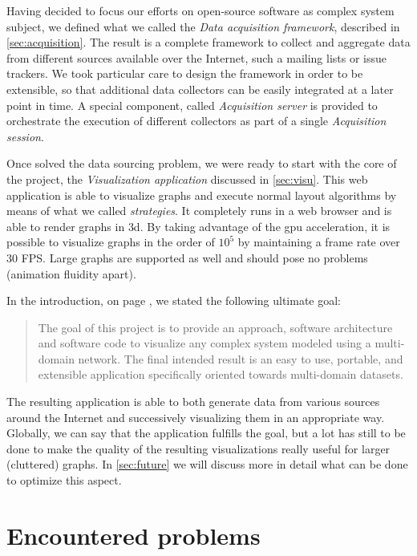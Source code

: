 Having decided to focus our efforts on open-source software as complex system subject, we defined what we called the \emph{Data acquisition framework}, described in \vref{sec:acquisition}. The result is a complete framework to collect and aggregate data from different sources available over the Internet, such a mailing lists or issue trackers. We took particular care to design the framework in order to be extensible, so that additional data collectors can be easily integrated at a later point in time. A special component, called \emph{Acquisition server} is provided to orchestrate the execution of different collectors as part of a single \emph{Acquisition session}.

Once solved the data sourcing problem, we were ready to start with the core of the project, the \emph{Visualization application} discussed in \vref{sec:visu}. This web application is able to visualize graphs and execute normal layout algorithms by means of what we called \emph{strategies}. It completely runs in a web browser and is able to render graphs in \gls{3d}. By taking advantage of the \gls{gpu} acceleration, it is possible to visualize graphs in the order of $10^5$ by maintaining a frame rate over 30 FPS. Large graphs are supported as well and should pose no problems (animation fluidity apart).

In the introduction, on page \pageref{sec:intro/goals}, we stated the following ultimate goal:

\begin{quote}
The goal of this project is to provide an approach, software architecture and software code to visualize any complex system modeled using a multi-domain network. The final intended result is an easy to use, portable, and extensible application specifically oriented towards multi-domain datasets.
\end{quote}

The resulting application is able to both generate data from various sources around the Internet and successively visualizing them in an appropriate way. Globally, we can say that the application fulfills the goal, but a lot has still to be done to make the quality of the resulting visualizations really useful for larger (cluttered) graphs. In \vref{sec:future} we will discuss more in detail what can be done to optimize this aspect.

\section{Encountered problems}
\label{sec:problems}

